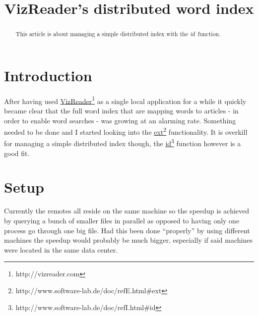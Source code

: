 \title{VizReader's distributed word index}

\maketitle





% 

\begin{abstract}
  This article is about managing a simple distributed index with the
  \emph{id}~function. 
\end{abstract}

\section{Introduction}
\label{sec:vizreader-introduction}

After having used \underline{VizReader}\footnote{http://vizreader.com} as a single local application for a while it quickly became clear that the full word index that are mapping words to articles - in order to enable word searches - was growing at an alarming rate. Something needed to be done and I started looking into the \underline{ext}\footnote{http://www.software-lab.de/doc/refE.html\#ext} functionality. It is overkill for managing a simple distributed index though, the \underline{id}\footnote{http://www.software-lab.de/doc/refI.html\#id} function however is a good fit.

\section{Setup}
\label{sec:vizreader-setup}

Currently the remotes all reside on the same machine so the speedup is achieved by querying a bunch of smaller files in parallel as opposed to having only one process go through one big file. Had this been done ``properly'' by using different machines the speedup would probably be much bigger, especially if said machines were located in the same data center.


